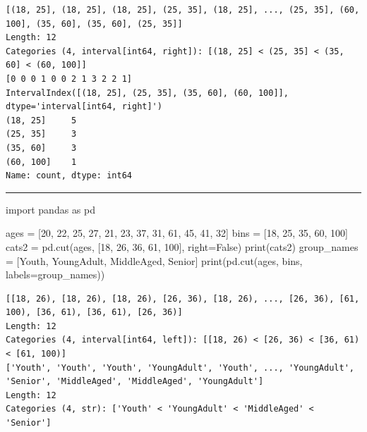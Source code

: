 \documentclass[
  english,
  letterpaper,
  DIV=11,
  numbers=noendperiod]{scrreprt}
\newenvironment{Shaded}{\begin{snugshade}}{\end{snugshade}}
\newcommand{\BuiltInTok}[1]{\textcolor[rgb]{0.00,0.23,0.31}{#1}}
\newcommand{\DecValTok}[1]{\textcolor[rgb]{0.68,0.00,0.00}{#1}}
\newcommand{\ImportTok}[1]{\textcolor[rgb]{0.00,0.46,0.62}{#1}}
\newcommand{\NormalTok}[1]{\textcolor[rgb]{0.00,0.23,0.31}{#1}}
\newcommand{\OperatorTok}[1]{\textcolor[rgb]{0.37,0.37,0.37}{#1}}
\newcommand{\StringTok}[1]{\textcolor[rgb]{0.13,0.47,0.30}{#1}}
\newcommand{\VariableTok}[1]{\textcolor[rgb]{0.07,0.07,0.07}{#1}}
\begin{document}
\begin{verbatim}
[(18, 25], (18, 25], (18, 25], (25, 35], (18, 25], ..., (25, 35], (60, 100], (35, 60], (35, 60], (25, 35]]
Length: 12
Categories (4, interval[int64, right]): [(18, 25] < (25, 35] < (35, 60] < (60, 100]]
[0 0 0 1 0 0 2 1 3 2 2 1]
IntervalIndex([(18, 25], (25, 35], (35, 60], (60, 100]], dtype='interval[int64, right]')
(18, 25]     5
(25, 35]     3
(35, 60]     3
(60, 100]    1
Name: count, dtype: int64
\end{verbatim}

\begin{center}\rule{0.5\linewidth}{0.5pt}\end{center}

\begin{Shaded}
\begin{Highlighting}[]
\ImportTok{import}\NormalTok{ pandas }\ImportTok{as}\NormalTok{ pd}

\NormalTok{ages }\OperatorTok{=}\NormalTok{ [}\DecValTok{20}\NormalTok{, }\DecValTok{22}\NormalTok{, }\DecValTok{25}\NormalTok{, }\DecValTok{27}\NormalTok{, }\DecValTok{21}\NormalTok{, }\DecValTok{23}\NormalTok{, }\DecValTok{37}\NormalTok{, }\DecValTok{31}\NormalTok{, }\DecValTok{61}\NormalTok{, }\DecValTok{45}\NormalTok{, }\DecValTok{41}\NormalTok{, }\DecValTok{32}\NormalTok{]}
\NormalTok{bins }\OperatorTok{=}\NormalTok{ [}\DecValTok{18}\NormalTok{, }\DecValTok{25}\NormalTok{, }\DecValTok{35}\NormalTok{, }\DecValTok{60}\NormalTok{, }\DecValTok{100}\NormalTok{]}
\NormalTok{cats2 }\OperatorTok{=}\NormalTok{ pd.cut(ages, [}\DecValTok{18}\NormalTok{, }\DecValTok{26}\NormalTok{, }\DecValTok{36}\NormalTok{, }\DecValTok{61}\NormalTok{, }\DecValTok{100}\NormalTok{], right}\OperatorTok{=}\VariableTok{False}\NormalTok{)}
\BuiltInTok{print}\NormalTok{(cats2)}
\NormalTok{group\_names }\OperatorTok{=}\NormalTok{ [}\StringTok{\textquotesingle{}Youth\textquotesingle{}}\NormalTok{, }\StringTok{\textquotesingle{}YoungAdult\textquotesingle{}}\NormalTok{,}
               \StringTok{\textquotesingle{}MiddleAged\textquotesingle{}}\NormalTok{, }\StringTok{\textquotesingle{}Senior\textquotesingle{}}\NormalTok{]}
\BuiltInTok{print}\NormalTok{(pd.cut(ages, bins, labels}\OperatorTok{=}\NormalTok{group\_names))}
\end{Highlighting}
\end{Shaded}

\begin{verbatim}
[[18, 26), [18, 26), [18, 26), [26, 36), [18, 26), ..., [26, 36), [61, 100), [36, 61), [36, 61), [26, 36)]
Length: 12
Categories (4, interval[int64, left]): [[18, 26) < [26, 36) < [36, 61) < [61, 100)]
['Youth', 'Youth', 'Youth', 'YoungAdult', 'Youth', ..., 'YoungAdult', 'Senior', 'MiddleAged', 'MiddleAged', 'YoungAdult']
Length: 12
Categories (4, str): ['Youth' < 'YoungAdult' < 'MiddleAged' < 'Senior']
\end{verbatim}
\end{document}
